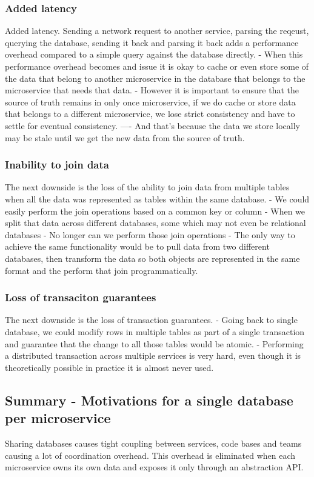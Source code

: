 \subsubsection{Added latency}
Added latency.
Sending a network request to another service, parsing the reqeust, querying the database, sending it back and parsing it back
adds a performance overhead compared to a simple query against the database directly.
- When this performance overhead becomes and issue it is okay to cache or even store some of the data that belong to another microservice in the database that belongs to the microservice that needs that data.
- However it is important to ensure that the source of truth remains in only once microservice, if we do cache or store data that belongs to a different microservice, we lose strict consistency and have to settle for eventual consistency.
---- And that's because the data we store locally may be stale until we get the new data from the source of truth.

\subsubsection{Inability to join data}
The next downside is the loss of the ability to join data from multiple tables when all the data was represented as tables within the same database.
- We could easily perform the join operations based on a common key or column
- When we split that data across different databases, some which may not even be relational databases
- No longer can we perform those join operations
- The only way to achieve the same functionality would be to pull data from two different databases, then transform the data so both objects are represented in the same format and the perform that join programmatically.

\subsubsection{Loss of transaciton guarantees}
The next downside is the loss of transaction guarantees.
- Going back to single database, we could modify rows in multiple tables as part of a single transaction and guarantee that the change to all those tables would be atomic.
- Performing a distributed transaction across multiple services is very hard, even though it is theoretically possible in practice it is almost never used.

\subsection{Summary - Motivations for a single database per microservice}
Sharing databases causes tight coupling between services, code bases and teams causing a lot of coordination overhead.
This overhead is eliminated when each microservice owns its own data and exposes it only through an abstraction API.

